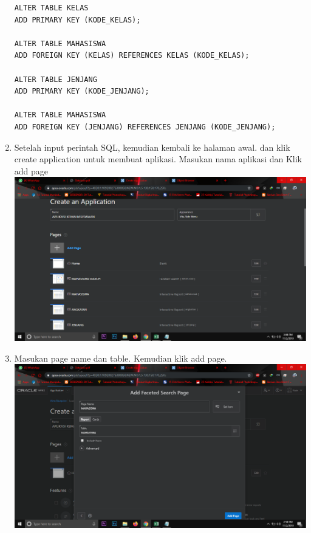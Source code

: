 \begin{enumerate}
\begin{lstlisting}
ALTER TABLE KELAS
ADD PRIMARY KEY (KODE_KELAS);

ALTER TABLE MAHASISWA
ADD FOREIGN KEY (KELAS) REFERENCES KELAS (KODE_KELAS);

ALTER TABLE JENJANG
ADD PRIMARY KEY (KODE_JENJANG);

ALTER TABLE MAHASISWA
ADD FOREIGN KEY (JENJANG) REFERENCES JENJANG (KODE_JENJANG);
\end{lstlisting}

\item Setelah input perintah SQL, kemudian kembali ke halaman awal. dan klik create application untuk membuat aplikasi. Masukan nama aplikasi dan Klik add page\\
\includegraphics[scale = 0.3]{gambar/9.png}

\item Masukan page name dan table. Kemudian klik add page.\\
\includegraphics[scale = 0.3]{gambar/10.png}


\end{enumerate}

